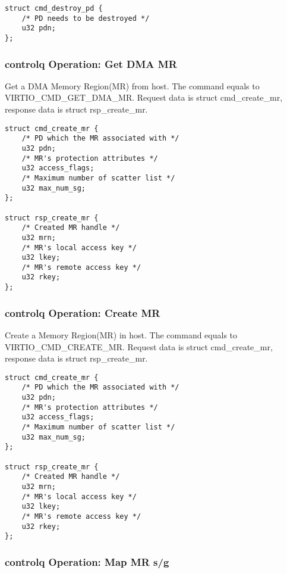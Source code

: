 \begin{lstlisting}
struct cmd_destroy_pd {
    /* PD needs to be destroyed */
    u32 pdn;
};
\end{lstlisting}

\subsubsection{controlq Operation: Get DMA MR}\label{sec:Device Types / RDMA Device / controlq Operation / Get DMA MR}

Get a DMA Memory Region(MR) from host. The command equals to VIRTIO_CMD_GET_DMA_MR.
Request data is struct cmd_create_mr, response data is struct rsp_create_mr.

\begin{lstlisting}
struct cmd_create_mr {
    /* PD which the MR associated with */
    u32 pdn;
    /* MR's protection attributes */
    u32 access_flags;
    /* Maximum number of scatter list */
    u32 max_num_sg;
};

struct rsp_create_mr {
    /* Created MR handle */
    u32 mrn;
    /* MR's local access key */
    u32 lkey;
    /* MR's remote access key */
    u32 rkey;
};
\end{lstlisting}

\subsubsection{controlq Operation: Create MR}\label{sec:Device Types / RDMA Device / controlq Operation / Create MR}

Create a Memory Region(MR) in host. The command equals to VIRTIO_CMD_CREATE_MR.
Request data is struct cmd_create_mr, response data is struct rsp_create_mr.

\begin{lstlisting}
struct cmd_create_mr {
    /* PD which the MR associated with */
    u32 pdn;
    /* MR's protection attributes */
    u32 access_flags;
    /* Maximum number of scatter list */
    u32 max_num_sg;
};

struct rsp_create_mr {
    /* Created MR handle */
    u32 mrn;
    /* MR's local access key */
    u32 lkey;
    /* MR's remote access key */
    u32 rkey;
};
\end{lstlisting}

\subsubsection{controlq Operation: Map MR s/g}\label{sec:Device Types / RDMA Device / controlq Operation / Map MR s/g}

